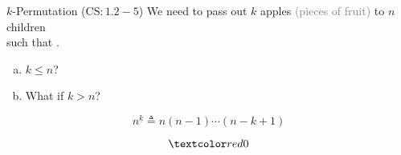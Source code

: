 
\begin{frame}{}
  \begin{exampleblock}{$k$-Permutation ($\text{CS}: 1.2-5$)}
    We need to pass out $k$  apples \textcolor{gray}{(pieces of fruit)} to $n$ children \\
    such that .

    \begin{enumerate}[(a)]
      \item $k \le n$?
      \item What if $k > n$?
    \end{enumerate}
  \end{exampleblock}

  \pause
  \[
    n^{\underline{k}} \triangleq n (n-1) \cdots (n-k+1)
  \]

  \pause
  \[
    \red{0}
  \]
\end{frame}
